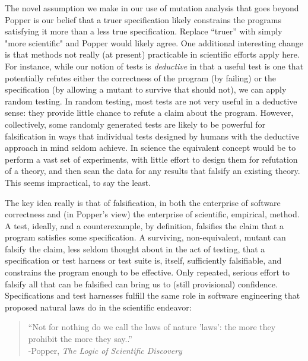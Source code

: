 \documentclass{svjour3}
\begin{document}
The novel assumption we make in our use of mutation analysis that goes
beyond Popper is our belief that a truer specification likely constrains
the programs satisfying it more than a less true specification.  Replace ``truer'' with
simply "more scientific" and Popper would likely agree.
One additional interesting change is that methods not really (at
present) practicable in scientific efforts apply here.  For instance,
while our notion of tests is \emph{deductive} in that a useful test is
one that potentially refutes either the correctness of the program (by
failing) or the specification (by allowing a mutant to survive that
should not), we can apply random testing.  In random testing, most
tests are not very useful in a deductive sense: they provide little
chance to refute a claim about the program.  However, collectively,
some randomly generated tests are likely to be powerful for
falsification in ways that individual tests designed by humans with
the deductive approach in mind seldom achieve.  In science the
equivalent concept would be to perform a vast set of experiments, with
little effort to design them for refutation of a theory, and then scan
the data for any results that falsify an existing theory.  This seems
impractical, to say the least.

The key idea really is that of falsification, in both the enterprise
of software correctness and (in Popper's view) the enterprise of
scientific, empirical, method.  A test, ideally, and a counterexample,
by definition, falsifies the claim that a program satisfies some
specification.  A surviving, non-equivalent, mutant can falsify the
claim, less seldom thought about in the act of testing, that a
specification or test harness or test suite is, itself, sufficiently
falsifiable, and constrains the program enough to be effective.  Only
repeated, serious effort to falsify all that can be falsified can
bring us to (still provisional) confidence.  Specifications and test
harnesses fulfill the same role in software engineering that proposed
natural laws do in the scientific endeavor:


\begin{quote}
``Not for nothing do we call the laws of nature 'laws': the more they
prohibit the more they say..''\\
-Popper, \emph{The Logic of Scientific Discovery} \cite{Popper}
\end{quote}
\end{document}
